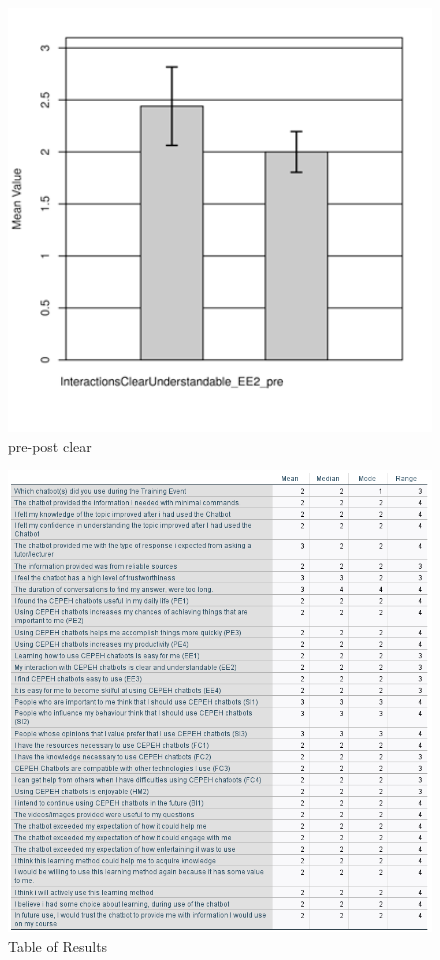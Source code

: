 \documentclass[a4paper, nobind]{templates/ociamthesis}
\begin{document}
\begin{figure}

{\centering \includegraphics[width=5.33in]{clear} 

}

\caption{pre-post clear}\label{fig:clearpic}
\end{figure}

\begin{figure}

{\centering \includegraphics[width=10.19in,height=1.25\textheight]{bigtable} 

}

\caption{Table of Results}\label{fig:bigtable}
\end{figure}
\end{document}
